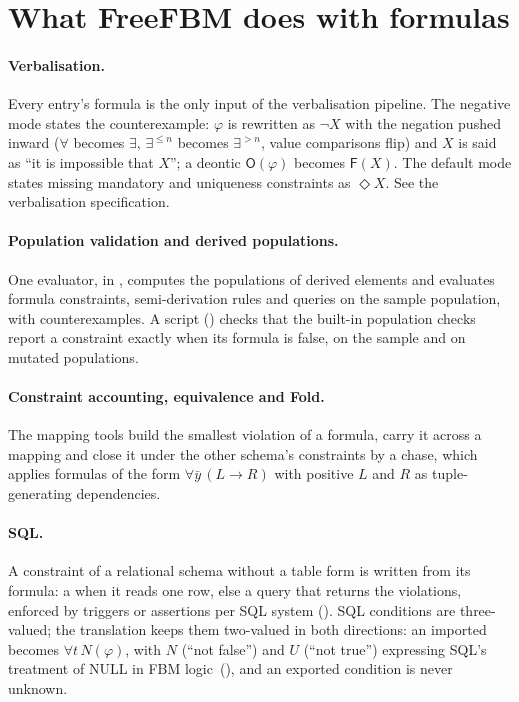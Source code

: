 \documentclass[11pt, a4paper]{article}
\newcommand{\FBM}{FBM logic}
\newcommand{\Ob}{\mathsf{O}}
\newcommand{\Fb}{\mathsf{F}}
\begin{document}
\section{What FreeFBM does with formulas}
\label{sec:uses}

\paragraph{Verbalisation.} Every entry's formula is the only input of the
verbalisation pipeline. The negative mode states the counterexample: $\varphi$
is rewritten as $\neg X$ with the negation pushed inward ($\forall$ becomes
$\exists$, $\exists^{\le n}$ becomes $\exists^{>n}$, value comparisons flip)
and $X$ is said as ``it is impossible that $X$''; a deontic $\Ob(\varphi)$
becomes $\Fb(X)$. The default mode states missing mandatory and uniqueness
constraints as $\Diamond X$. See the verbalisation specification.

\paragraph{Population validation and derived populations.} One evaluator,
in , computes the populations of derived
elements and evaluates formula constraints, semi-derivation rules and
queries on the sample population, with counterexamples. A script
() checks that the built-in
population checks report a constraint exactly when its formula is false, on
the sample and on mutated populations.

\paragraph{Constraint accounting, equivalence and Fold.} The mapping tools
build the smallest violation of a formula, carry it across a mapping and
close it under the other schema's constraints by a chase, which applies
formulas of the form $\forall\bar y\,(L\to R)$ with positive $L$ and $R$ as
tuple-generating dependencies.

\paragraph{SQL.} A constraint of a relational schema without a table form is
written from its formula: a  when it reads one row, else a query that
returns the violations, enforced by triggers or assertions per SQL system
(). SQL conditions are three-valued; the
translation keeps them two-valued in both directions: an imported 
becomes $\forall t\,N(\varphi)$, with $N$ (``not false'') and $U$ (``not
true'') expressing SQL's treatment of NULL in \FBM\
(), and an exported condition is never
unknown.
\end{document}

